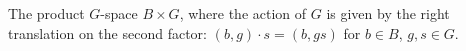 The product $G$-space $B \times G$, where the action of $G$ is given by the right translation on the second factor: $(b, g) \cdot s = (b, gs)$ for $b \in B$, $g, s \in G$.